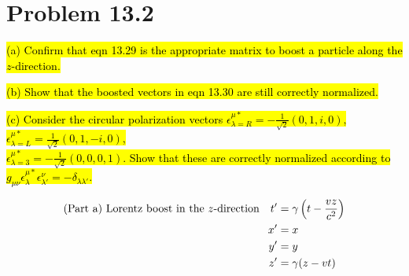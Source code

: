 \documentclass{article}
\begin{document}
\section*{Problem 13.2}
\begin{quoting}
  \hl{(a)  Confirm that eqn 13.29 is the appropriate matrix to boost a particle along the $z$-direction.}

  \hl{(b)  Show that the boosted vectors in eqn 13.30 are still correctly normalized.}

  \hl{(c)  Consider the circular polarization vectors $\epsilon^{\mu*}_{\lambda=R}=-\frac{1}{\sqrt{2}}(0,1,i,0)$, $\epsilon^{\mu*}_{\lambda=L}=\frac{1}{\sqrt{2}}(0,1,-i,0)$,\\$\epsilon^{\mu*}_{\lambda=3}=-\frac{1}{\sqrt{2}}(0,0,0,1)$. Show that these are correctly normalized according to $g_{\mu\nu}\epsilon^{\mu*}_\lambda \epsilon^\nu_{\lambda'}=-\delta_{\lambda\lambda'}$.}
\end{quoting}


\begin{align*}
  \qq*{(Part a)  Lorentz boost in the $z$-direction}t' & =\gamma\left(t-\frac{vz}{c^2}\right) \\
  x'                                                   & =x                                   \\
  y'                                                   & =y                                   \\
  z'                                                   & =\gamma(z-vt)                        \\
\end{align*}
\end{document}
